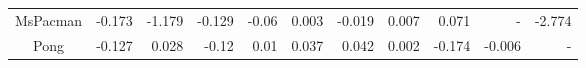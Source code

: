 {\begin{tabular}{c|R|R|R|R|R|R|R|R|R|R}
MsPacman     &                    -0.173 &                 -1.179 &                       -0.129 &                  -0.06 &                        0.003 &                 -0.019 &                     0.007 &                     0.071 &       -                   &               -2.774 \\
Pong         &                    -0.127 &                  0.028 &                        -0.12 &                   0.01 &                        0.037 &                  0.042 &                     0.002 &                    -0.174 &                   -0.006 &             -         \\
\end{tabular}%
}
